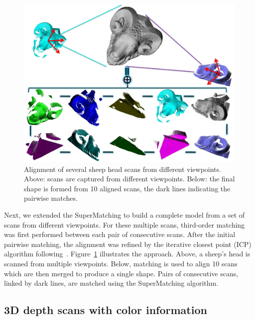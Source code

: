 \begin{figure}[t!]
\centering
  \includegraphics[width=0.99\linewidth]{figures/3DRigid.pdf}
  \caption{Alignment of several sheep head scans from different viewpoints.
  Above: scans are captured from different viewpoints. Below: the final shape is formed from 10 aligned scans, the dark lines indicating the pairwise matches.}
\label{fig:3DRigid}
\end{figure}

Next, we extended the SuperMatching to build a complete model from a set of scans from different viewpoints.
For these multiple scans,  third-order matching was first performed between each pair of consecutive scans.
After the initial pairwise matching, the alignment was refined by the iterative closest point (ICP) algorithm following~\cite{Gelfand05}.
Figure~\ref{fig:3DRigid} illustrates the approach.
Above, a sheep's head is scanned from multiple viewpoints. Below, matching is used to align 10 scans which are then merged to produce a single shape.
Pairs of consecutive scans, linked by dark lines, are matched using the SuperMatching algorithm.


\subsection{3D depth scans with color information}
\label{subsec:3dColored}


